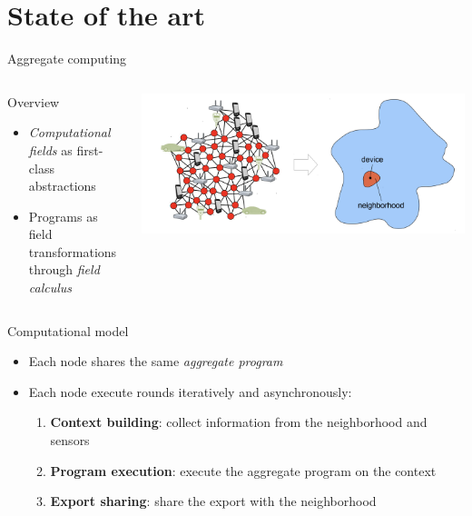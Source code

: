 \documentclass[presentation]{beamer}\mode<presentation>{\usetheme{AMSBolognaFC}}
\begin{document}
\section{State of the art}

\begin{frame}[allowframebreaks]{Aggregate computing}
\begin{columns}
\begin{column}{0.55\textwidth}
	\begin{block}{Overview}
		\begin{itemize}
			\item \emph{Computational fields} \cite{mamei2004cofields, viroli2019distributed} as first-class abstractions
			\item Programs as field transformations through \emph{field calculus} \cite{viroli2016higher}
		\end{itemize}
	\end{block}
\end{column}
\begin{column}{0.45\textwidth}
\includegraphics[width=\textwidth]{img/ac.png}
\end{column}
\end{columns}

\centering
\begin{alertblock}{Computational model}
\begin{itemize}
	\item Each node shares the same \emph{aggregate program}
	\item Each node execute rounds iteratively and asynchronously:
	\begin{enumerate}
		\item \textbf{Context building}: collect information from the neighborhood and sensors
		\item \textbf{Program execution}: execute the aggregate program on the context
		\item \textbf{Export sharing}: share the export with the neighborhood
	\end{enumerate}
\end{itemize}
\end{alertblock}


\end{frame}
\end{document}
